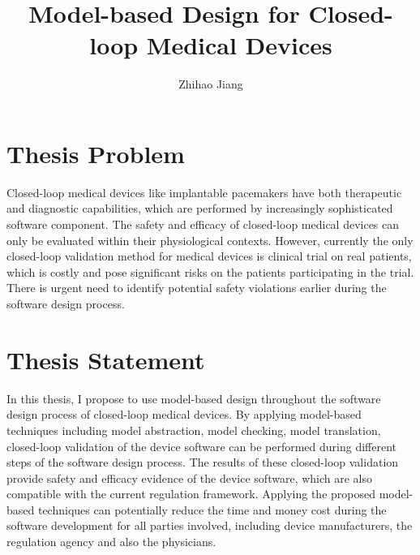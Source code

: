 \documentclass[a4paper]{article}
\title{Model-based Design for Closed-loop Medical Devices}
\author{Zhihao Jiang}
\begin{document}
\maketitle


\section*{Thesis Problem}
Closed-loop medical devices like implantable pacemakers have both therapeutic and diagnostic capabilities, which are performed by increasingly sophisticated software component. 
The safety and efficacy of closed-loop medical devices can only be evaluated within their physiological contexts. 
However, currently the only closed-loop validation method for medical devices is clinical trial on real patients, which is costly and pose significant risks on the patients participating in the trial. 
There is urgent need to identify potential safety violations earlier during the software design process.

\section*{Thesis Statement}
In this thesis, I propose to use model-based design throughout the software design process of closed-loop medical devices. 
By applying model-based techniques including model abstraction, model checking, model translation, closed-loop validation of the device software can be performed during different steps of the software design process.
The results of these closed-loop validation provide safety and efficacy evidence of the device software, which are also compatible with the current regulation framework. 
Applying the proposed model-based techniques can potentially reduce the time and money cost during the software development for all parties involved, including device manufacturers, the regulation agency and also the physicians.
\end{document}
